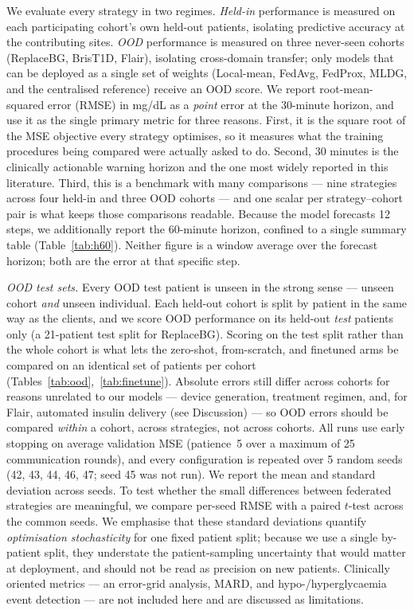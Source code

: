 \documentclass[10pt,letterpaper]{article}
\begin{document}
We evaluate every strategy in two regimes. \emph{Held-in} performance is measured
on each participating cohort's own held-out patients, isolating predictive
accuracy at the contributing sites. \emph{OOD} performance is measured on three
never-seen cohorts (ReplaceBG, BrisT1D, Flair), isolating cross-domain transfer; only models that can be deployed as a
single set of weights (Local-mean, FedAvg, FedProx, MLDG, and the centralised
reference) receive an OOD score.
We report root-mean-squared error (RMSE) in mg/dL as a \emph{point} error at the
30-minute horizon, and use it as the single primary metric for three reasons.
First, it is the square root of the MSE objective every strategy optimises, so it
measures what the training procedures being compared were actually asked to do.
Second, 30 minutes is the clinically actionable warning horizon and the one most
widely reported in this literature. Third, this is a benchmark with many comparisons --- nine
strategies across four held-in and three OOD cohorts --- and one scalar per
strategy--cohort pair is what keeps those comparisons readable. Because the model
forecasts 12 steps, we additionally report the 60-minute horizon, confined to a
single summary table (Table~\ref{tab:h60}). Neither figure is a window average
over the forecast horizon; both are the error at that specific step.

\emph{OOD test sets.} Every OOD test patient is unseen in the strong sense --- unseen
cohort \emph{and} unseen individual. Each held-out cohort is split by patient in
the same way as the clients, and we score OOD performance on its held-out
\emph{test} patients only (a 21-patient test split for ReplaceBG). Scoring on the
test split rather than the whole cohort is what lets the zero-shot, from-scratch,
and finetuned arms be compared on an identical set of patients per cohort
(Tables~\ref{tab:ood},~\ref{tab:finetune}). Absolute errors still differ across
cohorts for reasons unrelated to our models --- device generation, treatment
regimen, and, for Flair, automated insulin delivery (see Discussion) --- so OOD
errors should be compared \emph{within} a cohort, across strategies, not across
cohorts. All runs use early stopping on average validation MSE (patience~5 over a
maximum of 25 communication rounds), and every configuration is repeated over 5
random seeds (42, 43, 44, 46, 47; seed 45 was not run). We report the mean and
standard deviation across seeds. To test whether the small differences between federated
strategies are meaningful, we compare per-seed RMSE with a paired $t$-test across
the common seeds. We emphasise that these standard deviations quantify
\emph{optimisation stochasticity} for one fixed patient split; because we use a
single by-patient split, they understate the patient-sampling uncertainty that
would matter at deployment, and should not be read as precision on new patients.
Clinically oriented metrics --- an error-grid analysis, MARD, and
hypo-/hyperglycaemia event detection --- are not included here and are discussed
as limitations.
\end{document}
